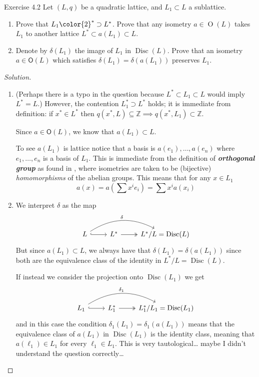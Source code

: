 \begin{idea5}{Exercise 4.2}\leavevmode
	Let $(L,q)$ be a quadratic lattice, and $L_1\subset L$ a sublattice.
	\begin{enumerate}[label=\alph*.]
	\item Prove that $L_1{\color{2}^*}\supset L^*$. Prove that any isometry $a\in\operatorname{O}(L)$ takes $L_1$ to another lattice $L^*\subset a(L_1)\subset L$.

	\item Denote by $ \delta(L_1)$ the image of $L_1$ in $\operatorname{Disc}(L)$. Prove that an isometry $a \in\mathsf{O}(L)$ which satisfies $\delta(L_1)=\delta(a(L_1))$ preserves $L_1$.
	\end{enumerate}
\end{idea5}
\begin{proof}[Solution]\leavevmode
	\begin{enumerate}[label=\alph*.]
		\item (Perhaps there is a typo in the question because $L^*\subset L_1 \subset L$ would imply $L^*=L$.) However, the contention $L_1^*\supset L^*$ holds; it is immediate from definition: if $x^*\in L^*$ then $q(x^*,L)\subseteq \mathbb{Z}\implies q(x^*,L_1)\subset \mathbb{Z}$.


			 Since $a\in\mathsf{O}(L)$, we know that $a(L_1)\subset L$.

			 To see $a(L_1)$ is lattice notice that a basis is $a(e_1),\ldots,a(e_n)$ where $e_1,\ldots,e_n$ is a basis of $L_1$. This is immediate from the definition of \textit{\textbf{orthogonal group}} as found in \cite{quadratic}, where isometries are taken to be (bijective) \textit{homomorphisms} of the abelian groups. This means that for any $x\in L_1$
		\[a(x)=a\left( \sum x^ie_i \right) =\sum x^ia(x_i)\]

	\item We interpret $\delta$ as the  map
		\[\begin{tikzcd}
			L\arrow[r,hook]\arrow[rr,bend left,"\delta"]& L^*\arrow[r,two heads]& L^*/L=\operatorname{Disc}(L)
		\end{tikzcd}\]
		But since $a(L_1)\subset L$, we always have that $\delta(L_1)=\delta(a(L_1))$ since both are the equivalence class of the identity in $L^* /L=\operatorname{Disc}(L)$.

		If instead we consider the projection onto $\operatorname{Disc}(L_1)$ we get 
\[\begin{tikzcd}
			L_1\arrow[r,hook]\arrow[rr,bend left,"\delta_1"]& L_1^*\arrow[r,two heads]& L_1^*/L_1=\operatorname{Disc}(L_1)
		\end{tikzcd}\]
		and in this case the condition $\delta_1(L_1)=\delta_1(a(L_1))$ means that the equivalence class of $a(L_1)$ in $\operatorname{Disc}(L_1)$ is the identity class, meaning that $a(\ell_1)\in L_1$ for every $\ell_1\in L_1$. {\color{2}This is very tautological… maybe I didn't understand the question correctly…}
	\end{enumerate}
\end{proof}

